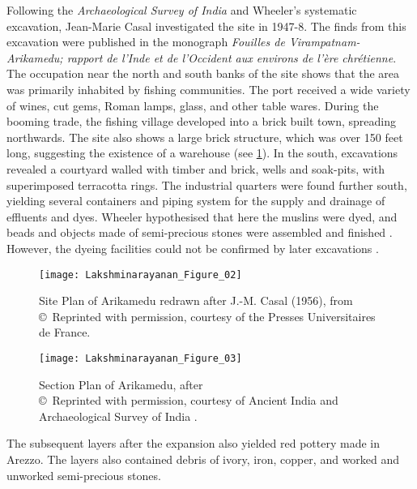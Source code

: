 Following the \emph{Archaeological Survey of India} and Wheeler’s systematic excavation, Jean-Marie Casal investigated the site in 1947-8. The finds from this excavation were published in the monograph \emph{Fouilles de Virampatnam-Arikamedu; rapport de l'Inde et de l'Occident aux environs de l'ère chrétienne}. The occupation near the north and south banks of the site shows that the area was primarily inhabited by fishing communities. The port received a wide variety of wines, cut gems, Roman lamps, glass, and other table wares. During the booming trade, the fishing village developed into a brick built town, spreading northwards. The site also shows a large brick structure, which was over \num{150} feet long, suggesting the existence of a warehouse (see \cref{fig:Lakshminarayanan_Figure_02}). In the south, excavations revealed a courtyard walled with timber and brick, wells and soak-pits, with superimposed terracotta rings. The industrial quarters were found further south, yielding several containers and piping system for the supply and drainage of effluents and dyes. Wheeler hypothesised that here the muslins were dyed, and beads and objects made of semi-precious stones were assembled and finished \parencite{wheeler1946}. However, the dyeing facilities could not be confirmed by later excavations \parencite[][109]{begley1996}.

\begin{figure}[!htb]
	\texttt{[image: Lakshminarayanan\_Figure\_02]}
	\caption{Site Plan of Arikamedu redrawn after J.-M. Casal (1956), from \textcite[][465]{begley1983}\\
		{\normalfont\scriptsize\copyright\ Reprinted with permission, courtesy of the Presses Universitaires de France.
	}}
	\label{fig:Lakshminarayanan_Figure_02}
\end{figure}

\begin{figure}[!htb]
	\texttt{[image: Lakshminarayanan\_Figure\_03]}
	\caption{Section Plan of Arikamedu, after \textcite[][]{wheeler1946}\\
		{\normalfont\scriptsize\copyright\ Reprinted with permission, courtesy of Ancient India and Archaeological Survey of India \parencite[][468]{begley1983}.
	}}
	\label{fig:Lakshminarayanan_Figure_03}
\end{figure}

The subsequent layers after the expansion also yielded red pottery made in Arezzo. The layers also contained debris of ivory, iron, copper, and worked and unworked semi-precious stones.

